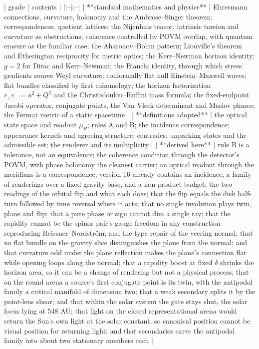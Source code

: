 | grade | contents |
|:--|:--|
| **standard mathematics and physics** | Ehresmann connections, curvature, holonomy and the Ambrose–Singer theorem; correspondences; quotient lattices; the Nijenhuis tensor, intrinsic torsion and curvature as obstructions; coherence controlled by POVM overlap, with quantum erasure as the familiar case; the Aharonov–Bohm pattern; Liouville's theorem and Etherington reciprocity for metric optics; the Kerr–Newman horizon identity; $g = 2$ for Dirac and Kerr–Newman; the Bianchi identity, through which stress gradients source Weyl curvature; conformally flat null Einstein–Maxwell waves; flat bundles classified by first cohomology; the horizon factorization $r_+r_- = a^2+Q^2$ and the Christodoulou–Ruffini mass formula; the fixed-endpoint Jacobi operator, conjugate points, the Van Vleck determinant and Maslov phases; the Fermat metric of a static spacetime |
| **definitions adopted** | the optical state space and readout $\mu_R$; rules A and B; the incidence correspondence; appearance kernels and agreeing structure; centrades, unpacking states and the admissible set; the renderer and its multiplicity |
| **derived here** | rule B is a tolerance, not an equivalence; the coherence condition through the detector's POVM, with phase holonomy the cleanest carrier; an optical readout through the meridians is a correspondence; version 16 already contains an incidence, a family of renderings over a fixed gravity base, and a non-product budget; the two readings of the orbital flip and what each does; that the flip equals the disk half-turn followed by time reversal where it acts; that no single involution plays twin, plane and flip; that a pure phase or sign cannot dim a single ray; that the rapidity cannot be the spinor pair's gauge freedom in any construction reproducing Reissner–Nordström; and the type repair of the veering normal; that no flat bundle on the gravity slice distinguishes the plane from the normal; and that curvature odd under the plane reflection makes the plane's connection flat while opening loops along the normal; that a rapidity boost at fixed $\delta$ shrinks the horizon area, so it can be a change of rendering but not a physical process; that on the round arena a source's first conjugate point is its twin, with the antipodal family a critical manifold of dimension two; that a weak secondary splits it by the point-lens shear; and that within the solar system the gate stays shut, the solar focus lying at $548$ AU; that light on the closed representational arena would return the Sun's own light at the solar constant, so canonical position cannot be visual position for returning light; and that secondaries carve the antipodal family into about two stationary members each |
